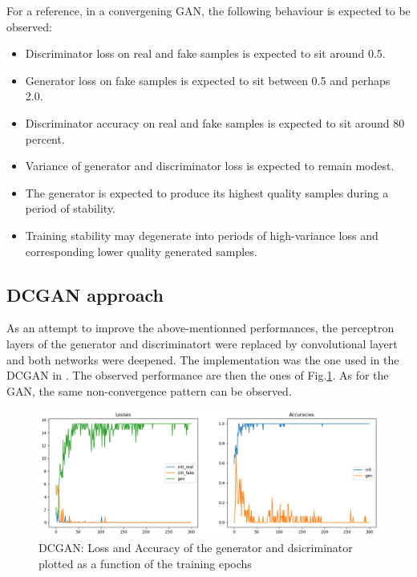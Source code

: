 \documentclass{article}
\begin{document}
For a reference, in a convergening GAN, the following behaviour is expected to be observed:

\begin{itemize}
    \item Discriminator loss on real and fake samples is expected to sit around 0.5.
    \item Generator loss on fake samples is expected to sit between 0.5 and perhaps 2.0.
    \item Discriminator accuracy on real and fake samples is expected to sit around 80 percent.
    \item Variance of generator and discriminator loss is expected to remain modest.
    \item The generator is expected to produce its highest quality samples during a period of stability.
    \item Training stability may degenerate into periods of high-variance loss and corresponding lower quality generated samples.
\end{itemize}

\subsection{DCGAN approach}

As an attempt to improve the above-mentionned performances, the perceptron layers of the generator and discriminatort were replaced by convolutional layert and both networks were deepened. The implementation was the one used in the DCGAN in \cite{eriklindernoren}. The observed performance are then the ones of Fig.\ref{fig:DCGAN_evals_loss_acc}. As for the GAN, the same non-convergence pattern can be observed.

\begin{figure}
    \centering
    \includegraphics[width=\textwidth]{../figs/DCGAN_evals_loss_acc.png}
    \caption{DCGAN: Loss and Accuracy of the generator and dsicriminator plotted as a function of the training epochs}
    \label{fig:DCGAN_evals_loss_acc}
\end{figure}
\end{document}

